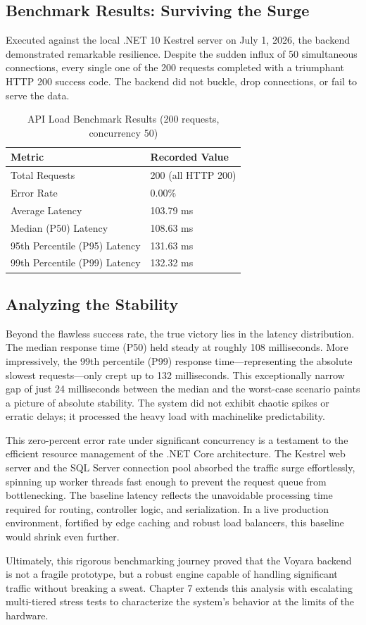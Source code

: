 \subsection{Benchmark Results: Surviving the Surge}
Executed against the local .NET 10 Kestrel server on July 1, 2026, the backend demonstrated remarkable resilience. Despite the sudden influx of 50 simultaneous connections, every single one of the 200 requests completed with a triumphant HTTP 200 success code. The backend did not buckle, drop connections, or fail to serve the data.

\begin{table}[H]
\centering
\begin{tabular}{|l|l|}
\hline
\textbf{Metric} & \textbf{Recorded Value} \\ \hline
Total Requests & 200 (all HTTP 200) \\ \hline
Error Rate & 0.00\% \\ \hline
Average Latency & 103.79 ms \\ \hline
Median (P50) Latency & 108.63 ms \\ \hline
95th Percentile (P95) Latency & 131.63 ms \\ \hline
99th Percentile (P99) Latency & 132.32 ms \\ \hline
\end{tabular}
\caption{API Load Benchmark Results (200 requests, concurrency 50)}
\label{tab:benchmark}
\end{table}

\subsection{Analyzing the Stability}
Beyond the flawless success rate, the true victory lies in the latency distribution. The median response time (P50) held steady at roughly 108 milliseconds. More impressively, the 99th percentile (P99) response time---representing the absolute slowest requests---only crept up to 132 milliseconds. This exceptionally narrow gap of just 24 milliseconds between the median and the worst-case scenario paints a picture of absolute stability. The system did not exhibit chaotic spikes or erratic delays; it processed the heavy load with machinelike predictability.

This zero-percent error rate under significant concurrency is a testament to the efficient resource management of the .NET Core architecture. The Kestrel web server and the SQL Server connection pool absorbed the traffic surge effortlessly, spinning up worker threads fast enough to prevent the request queue from bottlenecking. The baseline latency reflects the unavoidable processing time required for routing, controller logic, and serialization. In a live production environment, fortified by edge caching and robust load balancers, this baseline would shrink even further.

Ultimately, this rigorous benchmarking journey proved that the Voyara backend is not a fragile prototype, but a robust engine capable of handling significant traffic without breaking a sweat. Chapter 7 extends this analysis with escalating multi-tiered stress tests to characterize the system's behavior at the limits of the hardware.
